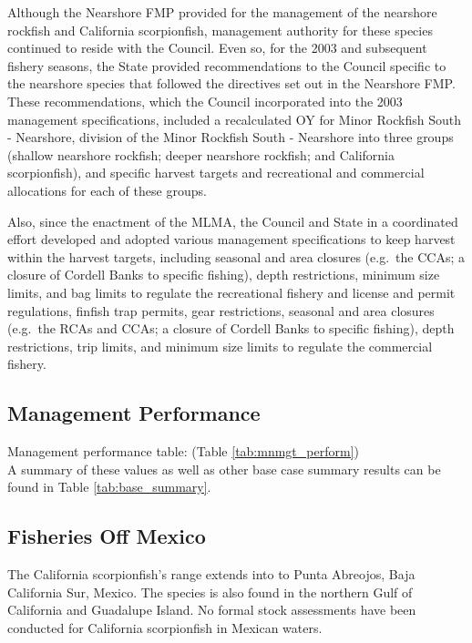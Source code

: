 \documentclass[12pt,]{article}
\begin{document}
Although the Nearshore FMP provided for the management of the nearshore
rockfish and California scorpionfish, management authority for these
species continued to reside with the Council. Even so, for the 2003 and
subsequent fishery seasons, the State provided recommendations to the
Council specific to the nearshore species that followed the directives
set out in the Nearshore FMP. These recommendations, which the Council
incorporated into the 2003 management specifications, included a
recalculated OY for Minor Rockfish South - Nearshore, division of the
Minor Rockfish South - Nearshore into three groups (shallow nearshore
rockfish; deeper nearshore rockfish; and California scorpionfish), and
specific harvest targets and recreational and commercial allocations for
each of these groups.

Also, since the enactment of the MLMA, the Council and State in a
coordinated effort developed and adopted various management
specifications to keep harvest within the harvest targets, including
seasonal and area closures (e.g.~the CCAs; a closure of Cordell Banks to
specific fishing), depth restrictions, minimum size limits, and bag
limits to regulate the recreational fishery and license and permit
regulations, finfish trap permits, gear restrictions, seasonal and area
closures (e.g.~the RCAs and CCAs; a closure of Cordell Banks to specific
fishing), depth restrictions, trip limits, and minimum size limits to
regulate the commercial fishery.

\subsection{Management Performance}\label{management-performance-1}

Management performance table: (Table \ref{tab:mnmgt_perform})\\
A summary of these values as well as other base case summary results can
be found in Table \ref{tab:base_summary}.

\subsection{Fisheries Off Mexico}\label{fisheries-off-mexico}

The California scorpionfish's range extends into to Punta Abreojos, Baja
California Sur, Mexico. The species is also found in the northern Gulf
of California and Guadalupe Island. No formal stock assessments have
been conducted for California scorpionfish in Mexican waters.
\end{document}
